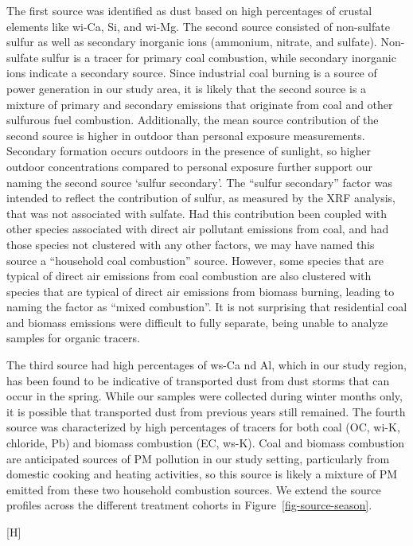 \documentclass[
  letterpaper,
  DIV=11,
  numbers=noendperiod]{scrartcl}
\makeatletter
\renewenvironment{figure}%
   {\renewcommand\familydefault\sfdefault
    \@float{figure}}
   {\end@float}
\makeatother
\begin{document}
The first source was identified as dust based on high percentages of
crustal elements like wi-Ca, Si, and wi-Mg. The second source consisted
of non-sulfate sulfur as well as secondary inorganic ions (ammonium,
nitrate, and sulfate). Non-sulfate sulfur is a tracer for primary coal
combustion, while secondary inorganic ions indicate a secondary source.
Since industrial coal burning is a source of power generation in our
study area, it is likely that the second source is a mixture of primary
and secondary emissions that originate from coal and other sulfurous
fuel combustion. Additionally, the mean source contribution of the
second source is higher in outdoor than personal exposure measurements.
Secondary formation occurs outdoors in the presence of sunlight, so
higher outdoor concentrations compared to personal exposure further
support our naming the second source `sulfur secondary'. The ``sulfur
secondary'' factor was intended to reflect the contribution of sulfur,
as measured by the XRF analysis, that was not associated with sulfate.
Had this contribution been coupled with other species associated with
direct air pollutant emissions from coal, and had those species not
clustered with any other factors, we may have named this source a
``household coal combustion'' source. However, some species that are
typical of direct air emissions from coal combustion are also clustered
with species that are typical of direct air emissions from biomass
burning, leading to naming the factor as ``mixed combustion''. It is not
surprising that residential coal and biomass emissions were difficult to
fully separate, being unable to analyze samples for organic tracers.

The third source had high percentages of ws-Ca nd Al, which in our study
region, has been found to be indicative of transported dust from dust
storms that can occur in the spring. While our samples were collected
during winter months only, it is possible that transported dust from
previous years still remained. The fourth source was characterized by
high percentages of tracers for both coal (OC, wi-K, chloride, Pb) and
biomass combustion (EC, ws-K). Coal and biomass combustion are
anticipated sources of PM pollution in our study setting, particularly
from domestic cooking and heating activities, so this source is likely a
mixture of PM emitted from these two household combustion sources. We
extend the source profiles across the different treatment cohorts in
Figure~\ref{fig-source-season}.

\begin{figure}[H]


\caption{\label{fig-source-figure}Source profiles for the 4-factor PMF
solution to the sum of elements, ions, elemental carbon, and organic
carbon for outdoor and personal PM\textsubscript{2.5} exposure
measurements. The lines separate the major contributing species to each
source.}

\end{figure}%
\end{document}
